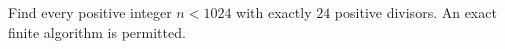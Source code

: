 Find every positive integer $n<1024$ with exactly $24$ positive divisors. An exact finite algorithm is permitted.
